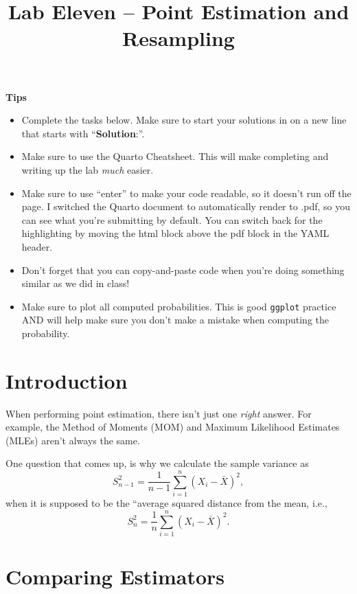 \documentclass[
]{article}
\title{Lab Eleven -- Point Estimation and Resampling}
\author{}
\date{}
\providecommand{\tightlist}{%
  \setlength{\itemsep}{0pt}\setlength{\parskip}{0pt}}
\begin{document}
\maketitle


\normalsize

\normalsize

\textbf{Tips}

\begin{itemize}
\tightlist
\item
  Complete the tasks below. Make sure to start your solutions in on a
  new line that starts with ``\textbf{Solution}:''.
\item
  Make sure to use the Quarto Cheatsheet. This will make completing and
  writing up the lab \emph{much} easier.
\item
  Make sure to use ``enter'' to make your code readable, so it doesn't
  run off the page. I switched the Quarto document to automatically
  render to .pdf, so you can see what you're submitting by default. You
  can switch back for the highlighting by moving the html block above
  the pdf block in the YAML header.
\item
  Don't forget that you can copy-and-paste code when you're doing
  something similar as we did in class!
\item
  Make sure to plot all computed probabilities. This is good
  \texttt{ggplot} practice AND will help make sure you don't make a
  mistake when computing the probability.
\end{itemize}

\section{Introduction}\label{introduction}

When performing point estimation, there isn't just one \emph{right}
answer. For example, the Method of Moments (MOM) and Maximum Likelihood
Estimates (MLEs) aren't always the same.

One question that comes up, is why we calculate the sample variance as
\[S_{n-1}^2 = \frac{1}{n-1} \sum_{i=1}^n (X_i -\bar{X})^2,\] when it is
supposed to be the ``average squared distance from the mean, i.e.,
\[S_n^2 = \frac{1}{n} \sum_{i=1}^n (X_i -\bar{X})^2.\]

\section{Comparing Estimators}\label{comparing-estimators}
\end{document}
